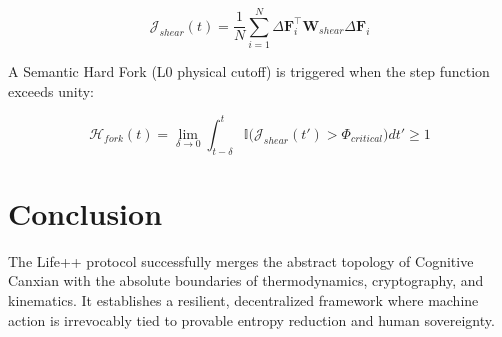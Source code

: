 \documentclass[conference]{IEEEtran}
\begin{document}
\begin{equation}
\mathcal{J}_{shear}(t) = \frac{1}{N} \sum_{i=1}^{N} \Delta \mathbf{F}_i^\top \mathbf{W}_{shear} \Delta \mathbf{F}_i
\end{equation}

A Semantic Hard Fork (L0 physical cutoff) is triggered when the step function exceeds unity:

\begin{equation}
\mathcal{H}_{fork}(t) = \lim_{\delta \to 0} \int_{t-\delta}^{t} \mathbb{I} \Big( \mathcal{J}_{shear}(t') > \Phi_{critical} \Big) dt' \ge 1
\end{equation}

\section{Conclusion}
The Life++ protocol successfully merges the abstract topology of Cognitive Canxian with the absolute boundaries of thermodynamics, cryptography, and kinematics. It establishes a resilient, decentralized framework where machine action is irrevocably tied to provable entropy reduction and human sovereignty.
\end{document}
